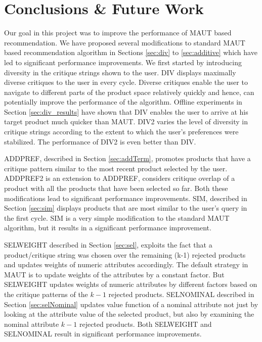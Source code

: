 \chapter{Conclusions \& Future Work}
\label{chap:conclusions}
Our goal in this project was to improve the performance of MAUT based recommendation.
We have proposed several modifications to standard MAUT based recommendation algorithm in Sections \ref{sec:div} to \ref{sec:additive} which have led to significant performance improvements.
We first started by introducing diversity in the critique strings shown to the user.
DIV displays maximally diverse critiques to the user in every cycle. 
Diverse critiques enable the user to navigate to different parts of the product space relatively quickly and hence, can potentially improve the performance of the algorithm.
Offline experiments in Section \ref{sec:div_results} have shown that DIV enables the user to arrive at his target product much quicker than MAUT.
DIV2 varies the level of diversity in critique strings according to the extent to which the user's preferences were stabilized.
The performance of DIV2 is even better than DIV.

ADDPREF, described in Section \ref{sec:addTerm}, promotes products that have a critique pattern similar to the most recent product selected by the user.
ADDPREF2 is an extension to ADDPREF, considers critique overlap of a product with all the products that have been selected so far.
Both these modifications lead to significant performance improvements.
SIM, described in Section \ref{sec:sim} displays products that are most similar to the user's query in the first cycle.
SIM is a very simple modification to the standard MAUT algorithm, but it results in a significant performance improvement.

SELWEIGHT described in Section \ref{sec:sel}, exploits the fact that a product/critique string was chosen over the remaining (k-1) rejected products and updates weights of numeric attributes accordingly. 
The default strategy in MAUT is to update weights of the attributes by a constant factor.
But SELWEIGHT updates weights of numeric attributes by different factors based on the critique patterns of the $k-1$ rejected products.
SELNOMINAL described in Section \ref{sec:selNominal} updates value function of a nominal attribute not just by looking at the attribute value of the selected product, but also by examining the nominal attribute $k-1$ rejected products.
Both SELWEIGHT and SELNOMINAL result in significant performance improvements.

